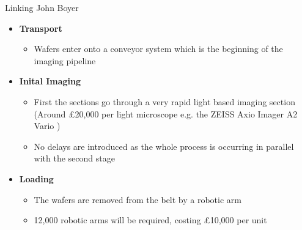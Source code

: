 \documentclass[10pt]{beamer}
\begin{document}
\begin{frame}{Linking \hspace{0pt plus 1 filll} \small{John Boyer}}
	\begin{itemize}[label={$\bullet$}]
		\item \textbf{Transport}
		\begin{itemize}[label={$\bullet$}]
			\item Wafers enter onto a conveyor system which is the beginning of the imaging pipeline
		\end{itemize}
		
		\item \textbf{Inital Imaging}
		\begin{itemize}[label={$\bullet$}]
			\item First the sections go through a very rapid light based imaging section (Around \pounds20,000 per light microscope e.g. the ZEISS Axio Imager A2 Vario \cite{ZeissAxio})
			\item No delays are introduced as the whole process is occurring in parallel with the second stage
			
		\end{itemize}
		
		\item \textbf{Loading}
		\begin{itemize}[label={$\bullet$}]
			\item The wafers are removed from the belt by a robotic arm 
			\item 12,000 robotic arms will be required, costing \pounds 10,000 per unit \cite{RoboArm}
		\end{itemize}
	\end{itemize}		
\end{frame}
\end{document}
